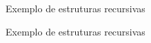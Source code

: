\begin{frame}[fragile]{Exemplo de estruturas recursivas}
\end{frame}

\begin{frame}[fragile]{Exemplo de estruturas recursivas}
\end{frame}

